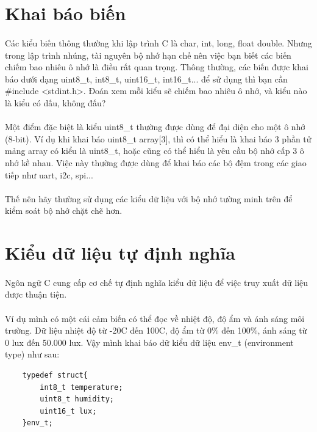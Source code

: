 \documentclass[12pt,a5paper]{book}
\begin{document}
	
	\section{Khai báo biến}
	\paragraph{}
Các kiểu biến thông thường khi lập trình C là char, int, long, float double. Nhưng trong lập trình nhúng, tài nguyên bộ nhớ hạn chế nên việc bạn biết các biến chiếm bao nhiêu ô nhớ là điều rất quan trọng. Thông thường, các biến được khai báo dưới dạng uint8\_t, int8\_t, uint16\_t, int16\_t... để sử dụng thì bạn cần  \#include <stdint.h>. Đoán xem mỗi kiểu sẽ chiếm bao nhiêu ô nhớ, và kiểu nào là kiểu có dấu, không đấu?
	\paragraph{}
	Một điểm đặc biệt là kiểu uint8\_t thường được dùng để đại diện cho một ô nhớ (8-bit). Ví dụ khi khai báo uint8\_t array[3], thì có thể hiểu là khai báo 3 phần tử mảng array có kiểu là uint8\_t, hoặc cũng có thể hiểu là yêu cầu bộ nhớ cấp 3 ô nhớ kề nhau. Việc này thường được dùng để khai báo các bộ đệm trong các giao tiếp như uart, i2c, spi...
	\paragraph{}
	Thế nên hãy thường sử dụng các kiểu dữ liệu với bộ nhớ tường minh trên để kiểm soát bộ nhớ chặt chẽ hơn.\\
\section{Kiểu dữ liệu tự định nghĩa}
\paragraph{}
Ngôn ngữ C cung cấp cơ chế tự định nghĩa kiểu dữ liệu để việc truy xuất dữ liệu được thuận tiện.

\paragraph{}
Ví dụ mình có một cái cảm biến có thể đọc về nhiệt độ, độ ẩm và ánh sáng môi trường. Dữ liệu nhiệt độ từ  -20\textdegree{}C đến 100\textdegree{}C, độ ẩm từ 0\% đến 100\%, ánh sáng từ 0 lux đến 50.000 lux. Vậy mình khai báo dữ kiểu dữ liệu env\_t (environment type) như sau: 
\begin{lstlisting}
	typedef struct{
		int8_t temperature;
		uint8_t humidity;
		uint16_t lux;
	}env_t;
\end{lstlisting}
\end{document}
